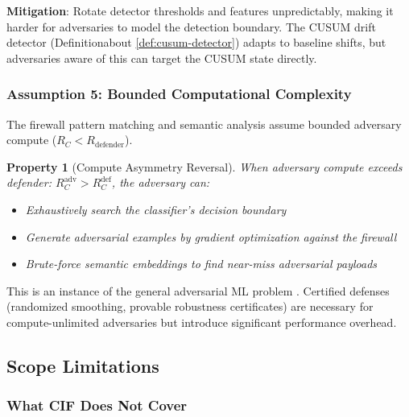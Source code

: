 \documentclass[
]{article}
\newtheorem{property}{Property}[section]
\begin{document}
\textbf{Mitigation}: Rotate detector thresholds and features
unpredictably, making it harder for adversaries to model the detection
boundary. The CUSUM drift detector
(Definitionabout \ref{def:cusum-detector}) adapts to baseline
shifts, but adversaries aware of this can target the CUSUM state
directly.

\subsubsection{Assumption 5: Bounded Computational
Complexity}\label{assumption-5-bounded-computational-complexity}

The firewall pattern matching and semantic analysis assume bounded
adversary compute (\(R_C < R_{\text{defender}}\)).

\begin{property}[Compute Asymmetry Reversal]
\label{prop:compute-limit}
When adversary compute exceeds defender: $R_C^{\text{adv}} > R_C^{\text{def}}$, the adversary can:
\begin{itemize}
\item Exhaustively search the classifier's decision boundary
\item Generate adversarial examples by gradient optimization against the firewall
\item Brute-force semantic embeddings to find near-miss adversarial payloads
\end{itemize}
\end{property}

This is an instance of the general adversarial ML problem
\cite{adaptive2025attacks}. Certified defenses (randomized smoothing,
provable robustness certificates) are necessary for compute-unlimited
adversaries but introduce significant performance overhead.

\subsection{Scope Limitations}\label{sec:scope-limits}

\subsubsection{What CIF Does Not Cover}\label{what-cif-does-not-cover}
\end{document}
